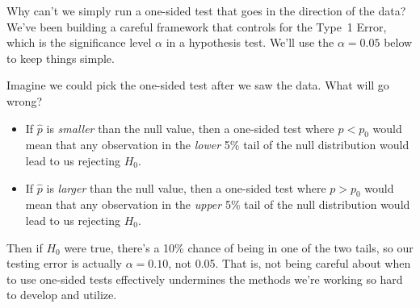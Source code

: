 
\begin{examplewrap}
\begin{nexample}{
    Why can't we simply run a one-sided
    test that goes in the direction of the data?}
  We've been building a careful framework that
  controls for the Type~1 Error, which is the
  significance level $\alpha$ in a hypothesis test.
  We'll use the $\alpha = 0.05$ below to keep
  things simple.

  Imagine we could pick the one-sided test after
  we saw the data. What will go wrong?
  \begin{itemize}
  \item If $\hat{p}$ is \emph{smaller} than
      the null value,
      then a one-sided test where $p < p_0$ would
      mean that any observation in the
      \emph{lower} 5\% tail of the null distribution
      would lead to us rejecting $H_0$.
  \item If $\hat{p}$ is \emph{larger} than
      the null value,
      then a one-sided test where $p > p_0$ would
      mean that any observation in the
      \emph{upper} 5\% tail of the null distribution
      would lead to us rejecting $H_0$.
  \end{itemize}
  Then if $H_0$ were true, there's a 10\% chance of
  being in one of the two tails, so our testing error
  is actually $\alpha = 0.10$, not 0.05.
  That is,
  not being careful about when to use one-sided tests
  effectively undermines the methods we're working
  so hard to develop and utilize.
\end{nexample}
\end{examplewrap}


